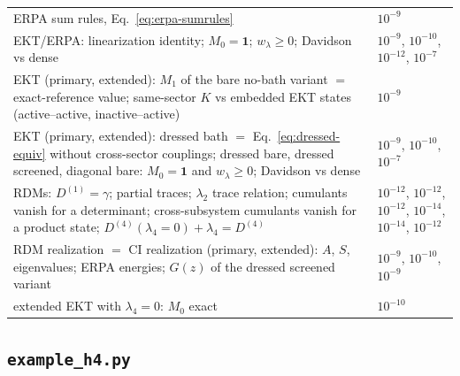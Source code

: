 \documentclass[11pt,a4paper]{article}
\newcommand{\code}[1]{\texttt{#1}}
\begin{document}
\begin{center}
\begin{tabular}{>{\raggedright\arraybackslash}p{9.4cm}>{\raggedright\arraybackslash}p{5.4cm}}
ERPA sum rules, Eq.~\eqref{eq:erpa-sumrules} & $10^{-9}$\\
EKT/ERPA: linearization identity; $M_0=\mathbf 1$; $w_\lambda\ge0$; Davidson vs dense & $10^{-9}$, $10^{-10}$, $10^{-12}$, $10^{-7}$\\
EKT (primary, extended): $M_1$ of the bare no-bath variant $=$ exact-reference value; same-sector $K$ vs embedded EKT states (active--active, inactive--active) & $10^{-9}$\\
EKT (primary, extended): dressed bath $=$ Eq.~\eqref{eq:dressed-equiv} without cross-sector couplings; dressed bare, dressed screened, diagonal bare: $M_0=\mathbf 1$ and $w_\lambda\ge0$; Davidson vs dense & $10^{-9}$, $10^{-10}$, $10^{-7}$\\
RDMs: $D^{(1)}=\gamma$; partial traces; $\lambda_2$ trace relation; cumulants vanish for a determinant; cross-subsystem cumulants vanish for a product state; $D^{(4)}(\lambda_4=0)+\lambda_4=D^{(4)}$ & $10^{-12}$, $10^{-12}$, $10^{-12}$, $10^{-14}$, $10^{-14}$, $10^{-12}$\\
RDM realization $=$ CI realization (primary, extended): $A$, $S$, eigenvalues; ERPA energies; $G(z)$ of the dressed screened variant & $10^{-9}$, $10^{-10}$, $10^{-9}$\\
extended EKT with $\lambda_4=0$: $M_0$ exact & $10^{-10}$\\
\bottomrule
\end{tabular}
\end{center}

\subsection{\code{example\_h4.py}}
\end{document}
